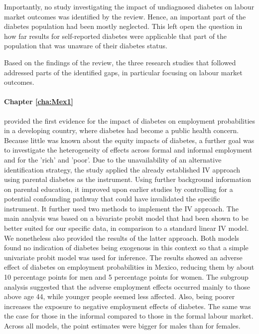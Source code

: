 Importantly, no study investigating the impact of undiagnosed diabetes on labour market outcomes was identified by the review. Hence, an important part of the diabetes population had been mostly neglected. This left open the question in how far results for self-reported diabetes were applicable that part of the population that was unaware of their diabetes status.

Based on the findings of the review, the three research studies that followed addressed parts of the identified gaps, in particular focusing on labour market outcomes. 

\paragraph{Chapter \ref{cha:Mex1}} provided the first evidence for the impact of diabetes on employment probabilities in a developing country, where diabetes had become a public health concern. Because little was known about the equity impacts of diabetes, a further goal was to investigate the heterogeneity of effects across formal and informal employment and for the 'rich' and 'poor'. Due to the unavailability of an alternative identification strategy, the study applied the already established \ac{IV} approach using parental diabetes as the instrument. Using further background information on parental education, it improved upon earlier studies by controlling for a potential confounding pathway that could have invalidated the specific instrument. It further used two methods to implement the \ac{IV} approach. The main analysis was based on a bivariate probit model that had been shown to be better suited for our specific data, in comparison to a standard linear \ac{IV} model. We nonetheless also provided the results of the latter approach. Both models found no indication of diabetes being exogenous in this context so that a simple univariate probit model was used for inference. The results showed an adverse effect of diabetes on employment probabilities in Mexico, reducing them by about 10 percentage points for men and 5 percentage points for women. The subgroup analysis suggested that the adverse employment effects occurred mainly to those above age 44, while younger people seemed less affected. Also, being poorer increases the exposure to negative employment effects of diabetes. The same was the case for those in the informal compared to those in the formal labour market. Across all models, the point estimates were bigger for males than for females. 

